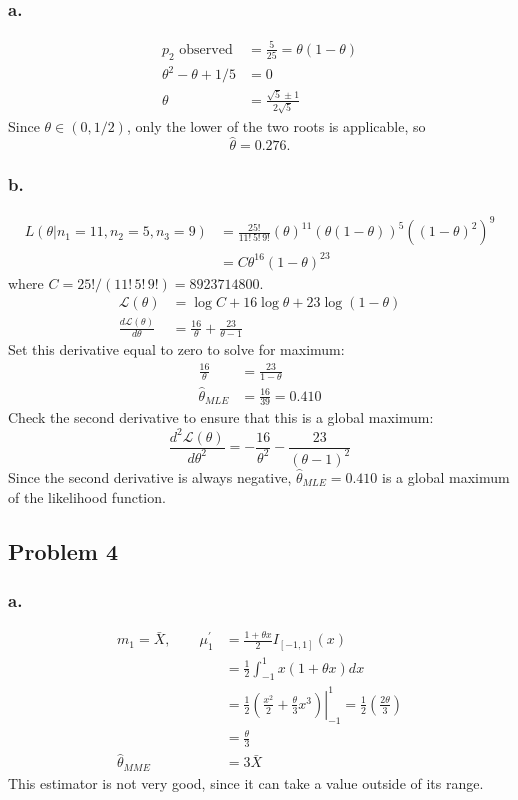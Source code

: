 \documentclass{article}
\begin{document}
\subsubsection{a.}
\begin{align*} 
p_2 \text{  observed} &= \frac{5}{25} = \theta(1-\theta) \\
\theta^2 - \theta +1/5 &= 0 \\
\theta &= \frac{\sqrt{5} \pm 1}{2\sqrt{5}}
\end{align*}
Since $\theta \in (0, 1/2)$, only the lower of the two roots is applicable, so \[\hat{\theta} = 0.276.\]

\subsubsection*{b.}
\begin{align*}
L(\theta|n_1=11, n_2=5, n_3=9) &= \frac{25!}{11!\,5!\,9!} \left(\theta\right)^{11}\left(\theta(1-\theta)\right)^5\left(\left(1-\theta\right)^2\right)^9 \\
&=C\theta^{16}\left(1-\theta\right)^{23}
\end{align*}
where $C = 25!/(11!\,5!\,9!) = 8923714800$.
\begin{align*}
\mathcal{L}(\theta) &= \log{C} + 16 \log{\theta} + 23 \log{(1-\theta)} \\
\frac{d\mathcal{L}(\theta)}{d\theta} &= \frac{16}{\theta}+\frac{23}{\theta-1}
\end{align*}
Set this derivative equal to zero to solve for maximum:
\begin{align*}
\frac{16}{\theta} &= \frac{23}{1-\theta} \\
\hat{\theta}_{MLE} &= \frac{16}{39} = 0.410
\end{align*}
Check the second derivative to ensure that this is a global maximum:
\[\frac{d^2\mathcal{L}(\theta)}{d\theta^2} = -\frac{16}{\theta^2}-\frac{23}{(\theta-1)^2}\]
Since the second derivative is always negative, $\hat{\theta}_{MLE} = 0.410$ is a global maximum of the likelihood function. 
\pagebreak
\subsection*{Problem 4}
\subsubsection*{a.}
\begin{align*}
m_1 = \bar{X},\quad\quad \mu_1^\prime&=\frac{1+\theta x}{2}I_{[-1,1]}(x) \\
&=\frac{1}{2}\int_{-1}^1 x\left(1+\theta x\right)dx \\
&= \frac{1}{2}\left.\left(\frac{x^2}{2}+\frac{\theta}{3}x^3\right)\right|_{-1}^1 = \frac{1}{2}\left(\frac{2\theta}{3}\right) \\
&= \frac{\theta}{3} \\
\hat{\theta}_{MME} &= 3\bar{X}
\end{align*}
This estimator is not very good, since it can take a value outside of its range. 
\end{document}
